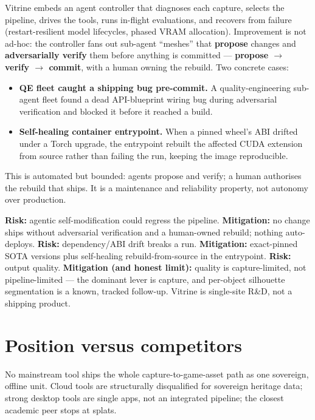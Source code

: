 \documentclass[a4paper,11pt]{article}
\begin{document}
Vitrine embeds an agent controller that diagnoses each capture, selects the pipeline, drives
the tools, runs in-flight evaluations, and recovers from failure (restart-resilient model
lifecycles, phased VRAM allocation). Improvement is not ad-hoc: the controller fans out
sub-agent ``meshes'' that \textbf{propose} changes and \textbf{adversarially verify} them
before anything is committed --- \textbf{propose $\to$ verify $\to$ commit}, with a human owning
the rebuild. Two concrete cases:

\begin{itemize}
\item \textbf{QE fleet caught a shipping bug pre-commit.} A quality-engineering sub-agent
  fleet found a dead API-blueprint wiring bug during adversarial verification and blocked it
  before it reached a build.
\item \textbf{Self-healing container entrypoint.} When a pinned wheel's ABI drifted under a
  Torch upgrade, the entrypoint rebuilt the affected CUDA extension from source rather than
  failing the run, keeping the image reproducible.
\end{itemize}

This is automated but bounded: agents propose and verify; a human authorises the rebuild that
ships. It is a maintenance and reliability property, not autonomy over production.

\begin{riskbox}
\textbf{Risk:} agentic self-modification could regress the pipeline. \textbf{Mitigation:} no
change ships without adversarial verification and a human-owned rebuild; nothing auto-deploys.
\quad\textbf{Risk:} dependency/ABI drift breaks a run. \textbf{Mitigation:} exact-pinned SOTA
versions plus self-healing rebuild-from-source in the entrypoint. \quad\textbf{Risk:} output
quality. \textbf{Mitigation (and honest limit):} quality is capture-limited, not
pipeline-limited --- the dominant lever is capture, and per-object silhouette segmentation is a
known, tracked follow-up. Vitrine is single-site R\&D, not a shipping product.
\end{riskbox}

\section{Position versus competitors}

No mainstream tool ships the whole capture-to-game-asset path as one sovereign, offline unit.
Cloud tools are structurally disqualified for sovereign heritage data; strong desktop tools
are single apps, not an integrated pipeline; the closest academic peer stops at splats.
\end{document}
